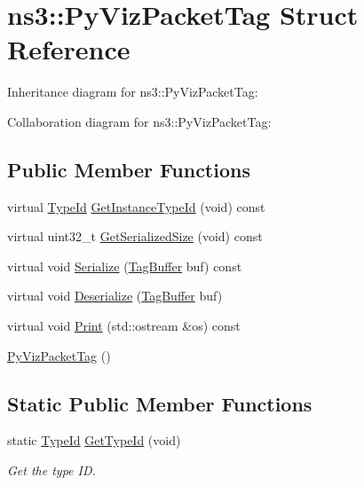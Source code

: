 \hypertarget{structns3_1_1PyVizPacketTag}{}\section{ns3\+:\+:Py\+Viz\+Packet\+Tag Struct Reference}
\label{structns3_1_1PyVizPacketTag}


Inheritance diagram for ns3\+:\+:Py\+Viz\+Packet\+Tag\+:


Collaboration diagram for ns3\+:\+:Py\+Viz\+Packet\+Tag\+:
\subsection*{Public Member Functions}
\begin{DoxyCompactItemize}
\item 
virtual \hyperlink{classns3_1_1TypeId}{Type\+Id} \hyperlink{structns3_1_1PyVizPacketTag_adbcf2605c3407d5ffbc05e983cae59b0}{Get\+Instance\+Type\+Id} (void) const 
\item 
virtual uint32\+\_\+t \hyperlink{structns3_1_1PyVizPacketTag_a63fb3d7d438fa8b84a195b678160d6e2}{Get\+Serialized\+Size} (void) const 
\item 
virtual void \hyperlink{structns3_1_1PyVizPacketTag_a8afbe41ea85a36875efb74fcbca3ccf7}{Serialize} (\hyperlink{classns3_1_1TagBuffer}{Tag\+Buffer} buf) const 
\item 
virtual void \hyperlink{structns3_1_1PyVizPacketTag_adae432b767eaa906180931cf739e2424}{Deserialize} (\hyperlink{classns3_1_1TagBuffer}{Tag\+Buffer} buf)
\item 
virtual void \hyperlink{structns3_1_1PyVizPacketTag_a0200f6b4950daff1852eff8da0b4fed0}{Print} (std\+::ostream \&os) const 
\item 
\hyperlink{structns3_1_1PyVizPacketTag_a765d0fbcb14ec7563e8a0706d7a5333c}{Py\+Viz\+Packet\+Tag} ()
\end{DoxyCompactItemize}
\subsection*{Static Public Member Functions}
\begin{DoxyCompactItemize}
\item 
static \hyperlink{classns3_1_1TypeId}{Type\+Id} \hyperlink{structns3_1_1PyVizPacketTag_acf98e75292b4b64b501f65863fede2df}{Get\+Type\+Id} (void)
\begin{DoxyCompactList}\small\item\em Get the type ID. \end{DoxyCompactList}\end{DoxyCompactItemize}

